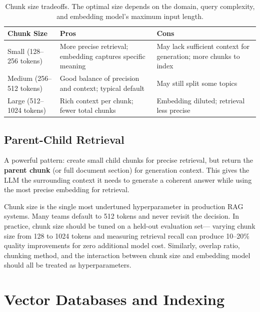 \begin{table}[H]
\centering
\small
\begin{tabularx}{\textwidth}{@{}l X X@{}}
\toprule
\textbf{Chunk Size} & \textbf{Pros} & \textbf{Cons} \\
\midrule
Small (128--256 tokens) & More precise retrieval; embedding captures specific meaning & May lack sufficient context for generation; more chunks to index \\
Medium (256--512 tokens) & Good balance of precision and context; typical default & May still split some topics \\
Large (512--1024 tokens) & Rich context per chunk; fewer total chunks & Embedding diluted; retrieval less precise \\
\bottomrule
\end{tabularx}
\caption{Chunk size tradeoffs.  The optimal size depends on the domain, query
complexity, and embedding model's maximum input length.}
\label{tab:chunk-size}
\end{table}

\subsection{Parent-Child Retrieval}

A powerful pattern: create small child chunks for precise retrieval, but
return the \textbf{parent chunk} (or full document section) for generation
context.  This gives the LLM the surrounding context it needs to generate
a coherent answer while using the most precise embedding for retrieval.

\begin{warningbox}
Chunk size is the single most undertuned hyperparameter in production RAG
systems.  Many teams default to 512 tokens and never revisit the decision.
In practice, chunk size should be tuned on a held-out evaluation set---
varying chunk size from 128 to 1024 tokens and measuring retrieval recall
can produce 10--20\% quality improvements for zero additional model cost.
Similarly, overlap ratio, chunking method, and the interaction between chunk
size and embedding model should all be treated as hyperparameters.
\end{warningbox}


\section{Vector Databases and Indexing}
\label{sec:vector-db}

